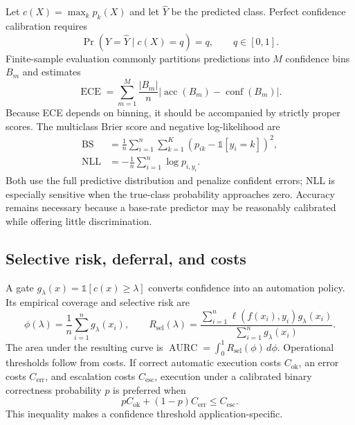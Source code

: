 \documentclass[11pt]{article}
\begin{document}
Let $c(X)=\max_k p_k(X)$ and let $\hat Y$ be the predicted class. Perfect confidence calibration requires
\begin{equation}
\Pr\!\left(Y=\hat Y\mid c(X)=q\right)=q,\qquad q\in[0,1].
\end{equation}
Finite-sample evaluation commonly partitions predictions into $M$ confidence bins $B_m$ and estimates
\begin{equation}
\operatorname{ECE}=\sum_{m=1}^{M}\frac{|B_m|}{n}
\left|\operatorname{acc}(B_m)-\operatorname{conf}(B_m)\right|.
\end{equation}
Because ECE depends on binning, it should be accompanied by strictly proper scores. The multiclass Brier score and negative log-likelihood are
\begin{align}
\operatorname{BS}&=\frac{1}{n}\sum_{i=1}^{n}\sum_{k=1}^{K}
\left(p_{ik}-\mathbb{1}[y_i=k]\right)^2,\\
\operatorname{NLL}&=-\frac{1}{n}\sum_{i=1}^{n}\log p_{i,y_i}.
\end{align}
Both use the full predictive distribution and penalize confident errors; NLL is especially sensitive when the true-class probability approaches zero. Accuracy remains necessary because a base-rate predictor may be reasonably calibrated while offering little discrimination.

\subsection{Selective risk, deferral, and costs}

A gate $g_\lambda(x)=\mathbb{1}[c(x)\geq\lambda]$ converts confidence into an automation policy. Its empirical coverage and selective risk are
\begin{equation}
\phi(\lambda)=\frac{1}{n}\sum_{i=1}^{n}g_\lambda(x_i),\qquad
R_{\mathrm{sel}}(\lambda)=
\frac{\sum_{i=1}^{n}\ell(f(x_i),y_i)g_\lambda(x_i)}
{\sum_{i=1}^{n}g_\lambda(x_i)}.
\end{equation}
The area under the resulting curve is $\operatorname{AURC}=\int_0^1R_{\mathrm{sel}}(\phi)\,d\phi$. Operational thresholds follow from costs. If correct automatic execution costs $C_{\mathrm{ok}}$, an error costs $C_{\mathrm{err}}$, and escalation costs $C_{\mathrm{esc}}$, execution under a calibrated binary correctness probability $p$ is preferred when
\begin{equation}
pC_{\mathrm{ok}}+(1-p)C_{\mathrm{err}}\leq C_{\mathrm{esc}}.
\end{equation}
This inequality makes a confidence threshold application-specific.
\end{document}
